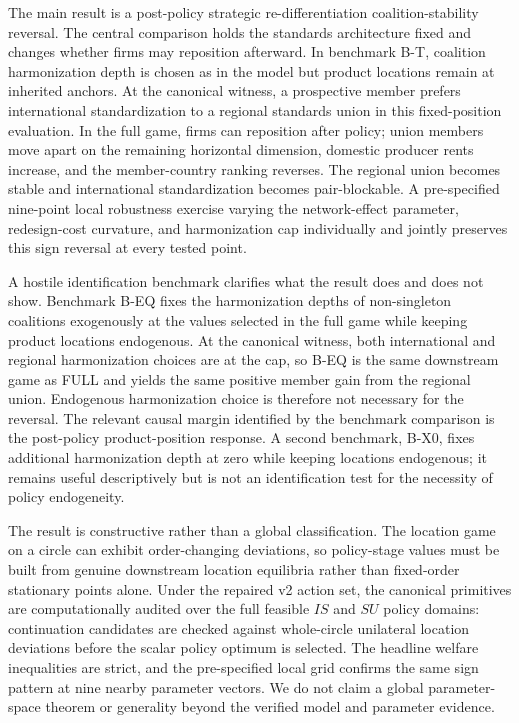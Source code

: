 The main result is a post-policy strategic re-differentiation coalition-stability reversal. The central comparison holds the standards architecture fixed and changes whether firms may reposition afterward. In benchmark B-T, coalition harmonization depth is chosen as in the model but product locations remain at inherited anchors. At the canonical witness, a prospective member prefers international standardization to a regional standards union in this fixed-position evaluation. In the full game, firms can reposition after policy; union members move apart on the remaining horizontal dimension, domestic producer rents increase, and the member-country ranking reverses. The regional union becomes stable and international standardization becomes pair-blockable. A pre-specified nine-point local robustness exercise varying the network-effect parameter, redesign-cost curvature, and harmonization cap individually and jointly preserves this sign reversal at every tested point.

A hostile identification benchmark clarifies what the result does and does not show. Benchmark B-EQ fixes the harmonization depths of non-singleton coalitions exogenously at the values selected in the full game while keeping product locations endogenous. At the canonical witness, both international and regional harmonization choices are at the cap, so B-EQ is the same downstream game as FULL and yields the same positive member gain from the regional union. Endogenous harmonization choice is therefore not necessary for the reversal. The relevant causal margin identified by the benchmark comparison is the post-policy product-position response. A second benchmark, B-X0, fixes additional harmonization depth at zero while keeping locations endogenous; it remains useful descriptively but is not an identification test for the necessity of policy endogeneity.

The result is constructive rather than a global classification. The location game on a circle can exhibit order-changing deviations, so policy-stage values must be built from genuine downstream location equilibria rather than fixed-order stationary points alone. Under the repaired v2 action set, the canonical primitives are computationally audited over the full feasible $IS$ and $SU$ policy domains: continuation candidates are checked against whole-circle unilateral location deviations before the scalar policy optimum is selected. The headline welfare inequalities are strict, and the pre-specified local grid confirms the same sign pattern at nine nearby parameter vectors. We do not claim a global parameter-space theorem or generality beyond the verified model and parameter evidence.

